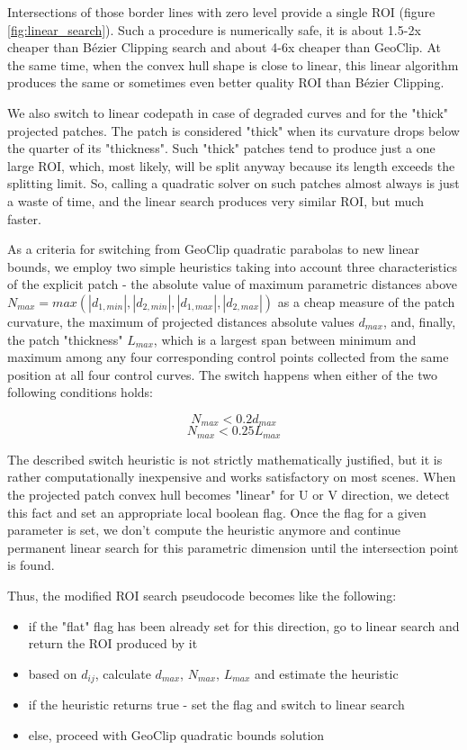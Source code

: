 \documentclass{jcgt}
\begin{document}
Intersections of those border lines with zero level provide a single ROI (figure \ref{fig:linear_search}). Such a procedure is numerically safe, it is about 1.5-2x cheaper than Bézier Clipping search and about 4-6x cheaper than GeoClip. At the same time, when the convex hull shape is close to linear, this linear algorithm produces the same or sometimes even better quality ROI than Bézier Clipping.

We also switch to linear codepath in case of degraded curves and for the "thick" projected patches. The patch is considered "thick" when its curvature drops below the quarter of its "thickness". Such "thick" patches tend to produce just a one large ROI, which, most likely, will be split anyway because its length exceeds the splitting limit. So, calling a quadratic solver on such patches almost always is just a waste of time, and the linear search produces very similar ROI, but much faster.

As a criteria for switching from GeoClip quadratic parabolas to new linear bounds, we employ two simple heuristics taking into account three characteristics of the explicit patch - the absolute value of maximum parametric distances above $N_{max}=max(|d_{1,min}|,|d_{2,min}|,|d_{1,max}|,|d_{2,max}|)$ as a cheap measure of the patch curvature, the maximum of projected distances absolute values $d_{max}$, and, finally, the patch "thickness" $L_{max}$, which is a largest span between minimum and maximum among any four corresponding control points collected from the same position at all four control curves. The switch happens when either of the two following conditions holds:

\[N_{max}<0.2d_{max}\]
\[N_{max}<0.25L_{max}\]

The described switch heuristic is not strictly mathematically justified, but it is rather computationally inexpensive and works satisfactory on most scenes. When the projected patch convex hull becomes "linear" for U or V direction, we detect this fact and set an appropriate local boolean flag. Once the flag for a given parameter is set, we don't compute the heuristic anymore and continue permanent linear search for this parametric dimension until the intersection point is found.

Thus, the modified ROI search pseudocode becomes like the following:
\begin{itemize}
\item if the "flat" flag has been already set for this direction, go to linear search and return the ROI produced by it
\item based on $d_{ij}$, calculate $d_{max}$, $N_{max}$, $L_{max}$ and estimate the heuristic
\item if the heuristic returns true - set the flag and switch to linear search
\item else, proceed with GeoClip quadratic bounds solution
\end{itemize}
\end{document}
